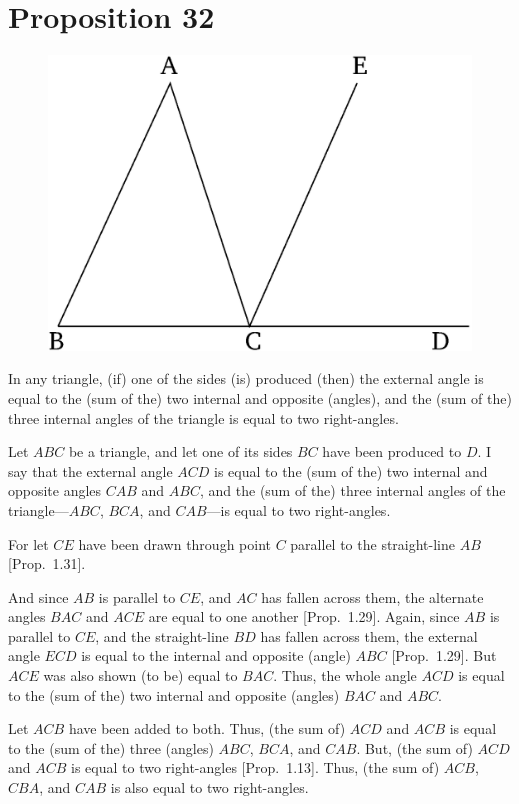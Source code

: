 \chapter*{Proposition 32}



\begin{figure}[ht]
    \begin{center}
    \includegraphics[width=0.5\linewidth]{figures/fig32e.eps}
    \label{fig:prop_32}
    \end{center}
\end{figure}

In any triangle,  (if) one of the sides (is) produced  (then) the external
angle is equal to the (sum of the) two internal and opposite (angles), and the (sum of the) three
internal angles of the triangle is equal to two right-angles.

Let $ABC$ be a triangle, and let one of its sides $BC$ have been produced to $D$.
I say that the external angle $ACD$ is equal to the (sum of the) two internal and opposite
angles $CAB$ and $ABC$, and the (sum of the) three internal angles of the triangle---$ABC$, $BCA$, and $CAB$---is equal to two right-angles.

For let $CE$ have been drawn through point $C$ parallel to the straight-line
$AB$ [Prop.~1.31].

And since $AB$ is parallel to $CE$, and $AC$ has fallen across them, the alternate
angles $BAC$ and $ACE$ are equal to one another [Prop.~1.29]. Again,
since $AB$ is parallel to $CE$, and the straight-line $BD$ has fallen across them, 
the external angle $ECD$ is equal to the internal and opposite (angle)
$ABC$ [Prop.~1.29]. But $ACE$ was also shown (to be) equal to $BAC$. Thus, the whole
angle $ACD$ is equal to the (sum of the) two internal and opposite (angles) $BAC$ and $ABC$.

Let $ACB$ have been added to both. Thus, (the sum of) $ACD$ and $ACB$ is equal to
the (sum of the) three (angles) $ABC$, $BCA$, and $CAB$. But, (the sum of) $ACD$ and $ACB$ is equal
to two right-angles [Prop.~1.13]. Thus, (the sum of) $ACB$, $CBA$, and $CAB$ is also
equal to two right-angles.

